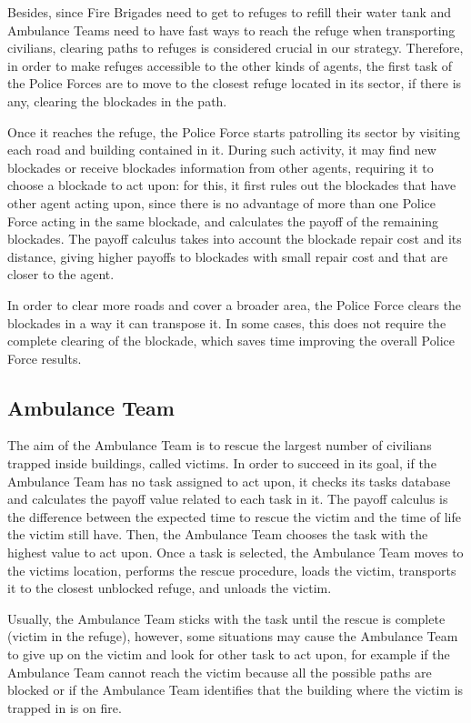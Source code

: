 \documentclass{llncs}
\begin{document}
Besides, since Fire Brigades need to get to refuges to refill their water tank and Ambulance Teams need to have fast ways to reach the refuge when transporting civilians, clearing paths to refuges is considered crucial in our strategy. Therefore, in order to make refuges accessible to the other kinds of agents, the first task of the Police Forces are to move to the closest refuge located in its sector, if there is any, clearing the blockades in the path.

Once it reaches the refuge, the Police Force starts patrolling its sector by visiting each road and building contained in it. During such activity, it may find new blockades or receive blockades information from other agents, requiring it to choose a blockade to act upon: for this, it first rules out the blockades that have other agent acting upon, since there is no advantage of more than one Police Force acting in the same blockade, and calculates the payoff of the remaining blockades. The payoff calculus takes into account the blockade repair cost and its distance, giving higher payoffs to blockades with small repair cost and that are closer to the agent.

In order to clear more roads and cover a broader area, the Police Force clears the blockades in a way it can transpose it. In some cases, this does not require the complete clearing of the blockade, which saves time improving the overall Police Force results.
\subsection{Ambulance Team}
\label{subsec:ambulanceTeam}
The aim of the Ambulance Team is to rescue the largest number of civilians trapped inside buildings, called victims. In order to succeed in its goal, if the Ambulance Team has no task assigned to act upon, it checks its tasks database and calculates the payoff value related to each task in it. The payoff calculus is the difference between the expected time to rescue the victim and the time of life the victim still have. Then, the Ambulance Team chooses the task with the highest value to act upon. Once a task is selected, the Ambulance Team moves to the victims location, performs the rescue procedure, loads the victim, transports it to the closest unblocked refuge, and unloads the victim.

Usually, the Ambulance Team sticks with the task until the rescue is complete (victim in the refuge), however, some situations may cause the Ambulance Team to give up on the victim and look for other task to act upon, for example if the Ambulance Team cannot reach the victim because all the possible paths are blocked or if the Ambulance Team identifies that the building where the victim is trapped in is on fire.
\end{document}
